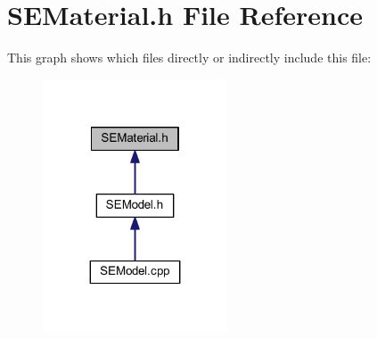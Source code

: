 \section{S\+E\+Material.\+h File Reference}
\label{_s_e_material_8h}
This graph shows which files directly or indirectly include this file\+:
\nopagebreak
\begin{figure}[H]
\begin{center}
\leavevmode
\includegraphics[width=155pt]{_s_e_material_8h__dep__incl}
\end{center}
\end{figure}
